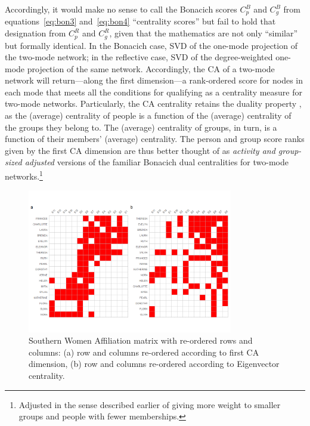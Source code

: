 \documentclass[a4paper,fleqn]{cas-sc}
\begin{document}
Accordingly, it would make no sense to call the Bonacich scores $C^B_p$ and $C^B_g$ from equations~\ref{eq:bon3} and~\ref{eq:bon4} ``centrality scores'' but fail to hold that designation from $C^R_p$ and $C^R_g$, given that the mathematics are not only ``similar'' \citep[162]{bonacich1991simultaneous} but formally identical. In the Bonacich case, SVD of the one-mode projection of the two-mode network; in the reflective case, SVD of the degree-weighted one-mode projection of the same network. Accordingly, the CA of a two-mode network will return---along the first dimension---a rank-ordered score for nodes in each mode that meets all the conditions for qualifying as a centrality measure for two-mode networks. Particularly, the CA centrality retains the duality property \citep[128]{faust2005using}, as the (average) centrality of people is a function of the (average) centrality of the groups they belong to. The (average) centrality of groups, in turn, is a function of their members' (average) centrality. The person and group score ranks given by the first CA dimension are thus better thought of as \textit{activity and group-sized adjusted} versions of the familiar Bonacich \citeyearpar{bonacich1991simultaneous} dual centralities for two-mode networks.\footnote{Adjusted in the sense described earlier of giving more weight to smaller groups and people with fewer memberships.} 

\begin{figure}
    \centering
    \includegraphics[width=0.8\textwidth]{Plots/ca-v-bon-reord.png}
    \caption{Southern Women Affiliation matrix with re-ordered rows and columns: (a) row and columns re-ordered according to first CA dimension, (b) row and columns re-ordered according to Eigenvector centrality.}
    \label{fig:ca-v-bon}
\end{figure}
\end{document}
